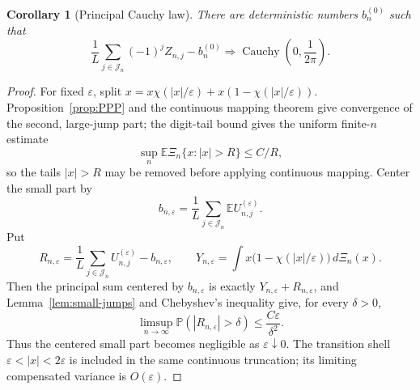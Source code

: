\documentclass[11pt,a4paper]{amsart}
\newtheorem{corollary}[theorem]{Corollary}
\theoremstyle{definition}
\theoremstyle{remark}
\newcommand{\E}{\mathbb E}
\newcommand{\Pp}{\mathbb P}
\begin{document}
\begin{corollary}[Principal Cauchy law]\label{cor:principal-cauchy}
There are deterministic numbers $b_n^{(0)}$ such that
\begin{equation}\label{eq:principal-cauchy}
 \frac1L\sum_{j\in\mathcal J_n}(-1)^jZ_{n,j}-b_n^{(0)}
 \Longrightarrow \operatorname{Cauchy}\!\left(0,\frac1{2\pi}\right).
\end{equation}
\end{corollary}

\begin{proof}
For fixed $\varepsilon$, split $x=x\chi(|x|/\varepsilon)
+x(1-\chi(|x|/\varepsilon))$.  Proposition~\ref{prop:PPP} and the
continuous mapping theorem give convergence of the second, large-jump part;
the digit-tail bound gives the uniform finite-$n$ estimate
\[
 \sup_n\E\Xi_n\{x:|x|>R\}\le C/R,
\]
so the tails $|x|>R$ may be removed before applying continuous mapping.
Center the small part by
\[
 b_{n,\varepsilon}=\frac1L\sum_{j\in\mathcal J_n}
 \E U_{n,j}^{(\varepsilon)}.
\]
Put
\[
 R_{n,\varepsilon}
 =\frac1L\sum_{j\in\mathcal J_n}U_{n,j}^{(\varepsilon)}
   -b_{n,\varepsilon},
 \qquad
 Y_{n,\varepsilon}
 =\int x\bigl(1-\chi(|x|/\varepsilon)\bigr)\,d\Xi_n(x).
\]
Then the principal sum centered by $b_{n,\varepsilon}$ is exactly
$Y_{n,\varepsilon}+R_{n,\varepsilon}$, and Lemma~\ref{lem:small-jumps}
and Chebyshev's inequality give, for every $\delta>0$,
\begin{equation}\label{eq:small-jump-prob}
 \limsup_{n\to\infty}
 \Pp(|R_{n,\varepsilon}|>\delta)
 \le \frac{C\varepsilon}{\delta^2}.
\end{equation}
Thus the centered small part becomes negligible as $\varepsilon\downarrow0$.
The transition shell
$\varepsilon<|x|<2\varepsilon$ is included in the same continuous
truncation; its limiting compensated variance is $O(\varepsilon)$.


\end{proof}
\end{document}
